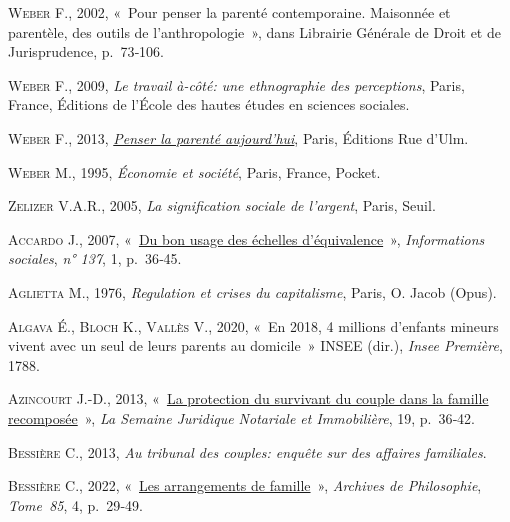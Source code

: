 \documentclass[
  12pt,
]{book}
\newlength{\cslhangindent}
\newenvironment{CSLReferences}[2] %
 {\begin{list}{}{%
  \setlength{\itemindent}{0pt}
  \setlength{\leftmargin}{0pt}
  \setlength{\parsep}{0pt}
  \ifodd #1
   \setlength{\leftmargin}{\cslhangindent}
   \setlength{\itemindent}{-1\cslhangindent}
  \fi
  \setlength{\itemsep}{#2\baselineskip}}}
 {\end{list}}
\begin{document}
\begin{CSLReferences}{0}{1}
\textsc{Weber F.}, 2002, {«~Pour penser la parenté contemporaine.
Maisonnée et parentèle, des outils de l{'}anthropologie~»}, dans
Librairie Générale de Droit et de Jurisprudence, p.~73‑106.

\textsc{Weber F.}, 2009, \emph{Le travail à-côté: une ethnographie des
perceptions}, Paris, France, Éditions de l'École des hautes études en
sciences sociales.

\textsc{Weber F.}, 2013,
\emph{\href{http://www.cairn.info/penser-la-parente-aujourd-hui--9782728805013.htm}{Penser
la parenté aujourd'hui}}, Paris, Éditions Rue d'Ulm.

\textsc{Weber M.}, 1995, \emph{Économie et société}, Paris, France,
Pocket.

\textsc{Zelizer V.A.R.}, 2005, \emph{La signification sociale de
l'argent}, Paris, Seuil.

\textsc{Accardo J.}, 2007,
{«~\href{https://www.cairn.info/revue-informations-sociales-2007-1-page-36.htm}{Du
bon usage des échelles d'équivalence}~»}, \emph{Informations sociales},
\emph{n° 137}, 1, p.~36‑45.

\textsc{Aglietta M.}, 1976, \emph{Regulation et crises du capitalisme},
Paris, O. Jacob (Opus).

\textsc{Algava É.}, \textsc{Bloch K.}, \textsc{Vallès V.}, 2020, {«~En
2018, 4 millions d{'}enfants mineurs vivent avec un seul de leurs
parents au domicile~»} \textsc{INSEE} (dir.), \emph{Insee Première},
1788.

\textsc{Azincourt J.-D.}, 2013,
{«~\href{https://halshs.archives-ouvertes.fr/halshs-00825353}{La
protection du survivant du couple dans la famille recomposée}~»},
\emph{La Semaine Juridique Notariale et Immobilière}, 19, p.~36‑42.

\textsc{Bessière C.}, 2013, \emph{Au tribunal des couples: enquête sur
des affaires familiales}.

\textsc{Bessière C.}, 2022,
{«~\href{https://doi.org/10.3917/aphi.854.0029}{Les arrangements de
famille}~»}, \emph{Archives de Philosophie}, \emph{Tome~85}, 4,
p.~29‑49.


\end{CSLReferences}
\end{document}
